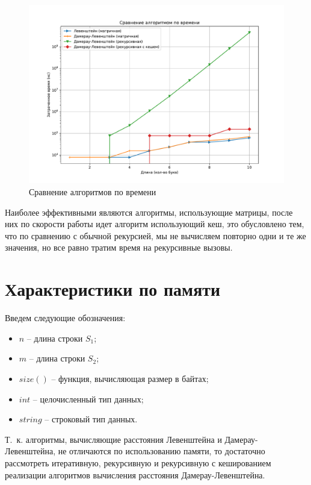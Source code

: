 \begin{figure}[h]
	\centering
	\includegraphics[width=0.7\textheight]{img/Figure_2.pdf}
	\caption{Сравнение алгоритмов по времени}
	\label{img:time}
\end{figure}

\clearpage

Наиболее эффективными являются алгоритмы, использующие матрицы, после них по скорости работы идет алгоритм использующий кеш, это обусловлено тем, что по сравнению с обычной рекурсией, мы не вычисляем повторно одни и те же значения, но все равно тратим время на рекурсивные вызовы. 

\section{Характеристики по памяти}

\label{memory}

Введем следующие обозначения:
\begin{itemize}
	\item $n$ -- длина строки $S_1$;
	\item $m$ -- длина строки $S_2$;
	\item $size()$ -- функция, вычисляющая размер в байтах;
	\item $int$ -- целочисленный тип данных;
	\item $string$ -- строковый тип данных.
\end{itemize}

Т.~к. алгоритмы, вычисляющие расстояния Левенштейна и Дамерау-Левенштейна, не отличаются по использованию памяти, то достаточно рассмотреть итеративную, рекурсивную и рекурсивную с кешированием реализации алгоритмов вычисления расстояния Дамерау-Левенштейна.


